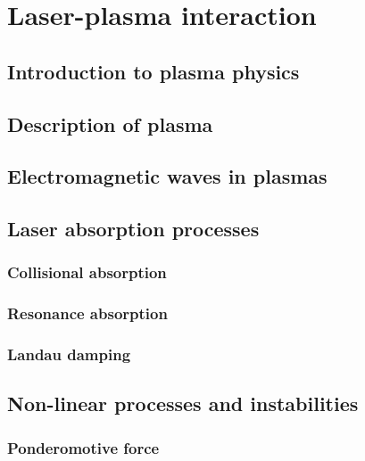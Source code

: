 \documentclass[12pt, twoside, a4paper, openright]{report}
\begin{document}

\chapter{Laser-plasma interaction}


\section{Introduction to plasma physics}


\section{Description of plasma}


\section{Electromagnetic waves in plasmas}


\section{Laser absorption processes}


\subsection{Collisional absorption}


\subsection{Resonance absorption}


\subsection{Landau damping}


\section{Non-linear processes and instabilities}


\subsection{Ponderomotive force}

\end{document}
